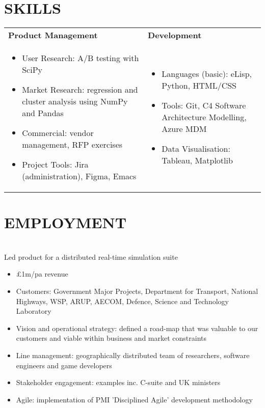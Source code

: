 \documentclass[a4paper,9pt]{extarticle}
\begin{document}
\section*{SKILLS}
\begin{tabular}{p{}p{}}
\textbf{Product Management} & \textbf{Development} \\
\begin{itemize}
    \item User Research: A/B testing with SciPy
    \item Market Research: regression and cluster analysis using NumPy and Pandas
    \item Commercial: vendor management, RFP exercises
    \item Project Tools: Jira (administration), Figma, Emacs
\end{itemize}
&
\begin{itemize}
    \item Languages (basic): eLisp, Python, HTML/CSS
    \item Tools: Git, C4 Software Architecture Modelling, Azure MDM
    \item Data Visualisation: Tableau, Matplotlib
\end{itemize}
\end{tabular}

\section*{EMPLOYMENT}
\\

\vspace{0.5em}
\indent\hspace{0.3em} Led product for a distributed real-time simulation suite
\begin{itemize}
    \item £1m/pa revenue
    \item Customers: Government Major Projects, Department for Transport, National Highways, WSP, ARUP, AECOM, Defence, Science and Technology Laboratory
\end{itemize}

\begin{itemize}
    \item Vision and operational strategy: defined a road-map that was valuable to our customers and viable within business and market constraints
    \item Line management: geographically distributed team of researchers, software engineers and game developers
    \item Stakeholder engagement: examples inc. C-suite and UK ministers
    \item Agile: implementation of PMI 'Disciplined Agile' development methodology
\end{itemize}
\end{document}
